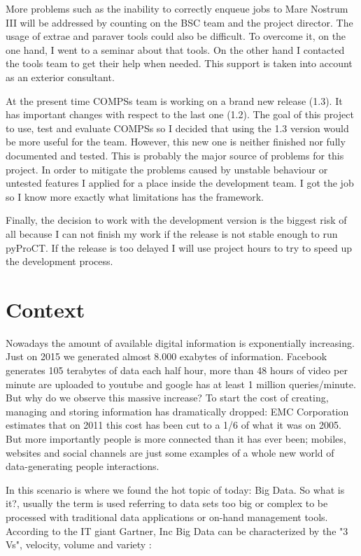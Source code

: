 More problems such as the inability to correctly enqueue jobs to Mare Nostrum III will be addressed by counting on the BSC team and the project director. The usage of extrae and paraver tools could also be difficult. To overcome it, on the one hand, I went to a seminar about that tools. On the other hand I contacted the tools team to get their help when needed. This support is taken into account as an exterior consultant. 

At the present time COMPSs team is working on a brand new release (1.3). It has important changes with respect to the last one (1.2). The goal of this project to use, test and evaluate COMPSs so I decided that using the 1.3 version would be more useful for the team. However, this new one is neither finished nor fully documented and tested. This is probably the major source of problems for this project. In order to mitigate the problems caused by unstable behaviour or untested features I applied for a place inside the development team. I got the job so I know more exactly what limitations has the framework. 

Finally, the decision to work with the development version is the biggest risk of all because I can not finish my work if the release is not stable enough to run pyProCT. If the release is too delayed I will use project hours to try to speed up the development process. 

\section{Context}


Nowadays the amount of available digital information is exponentially increasing. Just on 2015 we generated almost 8.000 exabytes of information. Facebook generates 105 terabytes of data each half hour, more than 48 hours of video per minute are uploaded to youtube and google has at least 1 million queries/minute. But why do we observe this massive increase? To start the cost of creating, managing and storing information has dramatically dropped: EMC Corporation estimates that on 2011 this cost has been cut to a 1/6 of what it was on 2005. But more importantly people is more connected than it has ever been; mobiles, websites and social channels are just some examples of a whole new world of data-generating people interactions. 

In this scenario is where we found the hot topic of today: Big Data. So what is it?, usually the term is used referring to data sets too big or complex to be processed with traditional data applications or on-hand management tools. According to the IT giant Gartner, Inc Big Data can be characterized by the "3 Vs", velocity, volume and variety \cite{Laney}:

